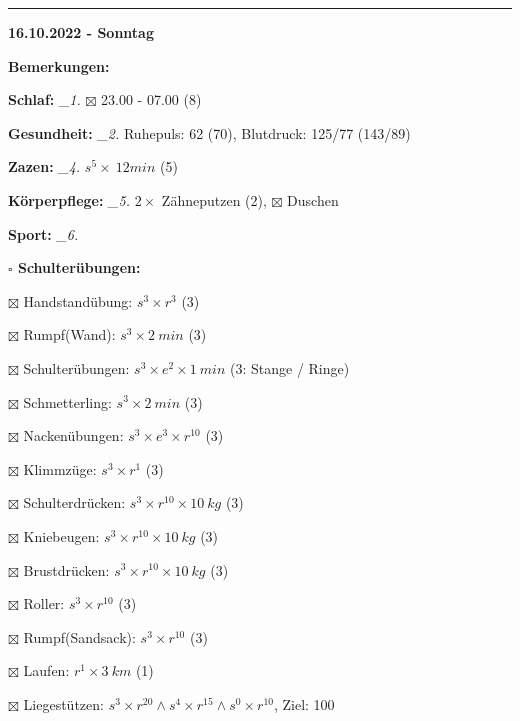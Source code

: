 \documentclass[10pt,a4paper]{article}
\newcommand\prop[1] {{\color {alizarin} {\bf #1}}}        %
\newcommand\rele[1] {{\color {english} \bf {#1}}}         %
\newcommand\mand[1] {{\color {burntorange} {\bf #1}}}     %
\newcommand\ddivide {\vskip -9pt \hrule \vskip 6pt}
\newcommand\topspace{\vskip -15pt \hskip 20pt}
\newcommand\n[1] { {\sl #1.} \hskip 5pt }
\begin{document}
\ddivide
{\rele {16.10.2022 - Sonntag}}
       
\begin{mdframed}[style=daystyle]
  \begin{labeling}{{\mand {Bemerkungen:}}}
    \setlength\itemsep{-3pt}
  \item[{\mand {Schlaf:}}]        \n{\_1} $\boxtimes$ 23.00 - 07.00 (8)
  \item[{\mand {Gesundheit:}}]    \n{\_2} Ruhepuls: 62 (70), Blutdruck: 125/77 (143/89)
  \item[{\mand {Zazen:}}]         \n{\_4} $s^5 \times\ 12 min$ (5)
  \item[{\mand {Körperpflege:}}]  \n{\_5} $2 \times$ Zähneputzen (2), $\boxtimes$ Duschen
  \item[{\mand {Sport:}}]         \n{\_6}
    \topspace
    \begin{minipage}{0.75\textwidth}  
      \begin{labeling}{\prop {$\square$ {Schulterübungen:}}} 
        \setlength\itemsep{-3pt}
      \item[$\boxtimes$ Handstandübung:]  $s^3 \times r^{3}$ (3)
      \item[$\boxtimes$ Rumpf(Wand):]     $s^3 \times 2\ min$ (3)
      \item[$\boxtimes$ Schulterübungen:] $s^3 \times e^2 \times 1\ min$ (3: Stange / Ringe)
      \item[$\boxtimes$ Schmetterling:]   $s^3 \times 2\ min$ (3)
      \item[$\boxtimes$ Nackenübungen:]   $s^3 \times e^3 \times r^{10}$ (3)
      \item[$\boxtimes$ Klimmzüge:]       $s^3 \times r^1$ (3)
      \item[$\boxtimes$ Schulterdrücken:] $s^3 \times r^{10} \times 10\ kg$ (3)
      \item[$\boxtimes$ Kniebeugen:]      $s^3 \times r^{10} \times 10\ kg$ (3)
      \item[$\boxtimes$ Brustdrücken:]    $s^3 \times r^{10} \times 10\ kg$ (3)
      \item[$\boxtimes$ Roller:]          $s^3 \times r^{10}$ (3)
      \item[$\boxtimes$ Rumpf(Sandsack):] $s^3 \times r^{10}$ (3)
      \item[$\boxtimes$ Laufen:]          $r^1 \times 3\ km$ (1)
      \item[$\boxtimes$ Liegestützen:]    $s^3 \times r^{20} \land s^4 \times r^{15} \land s^0 \times r^{10}$, Ziel: 100
      \end{labeling}

\end{minipage}
\end{labeling}
\end{mdframed}
\end{document}
